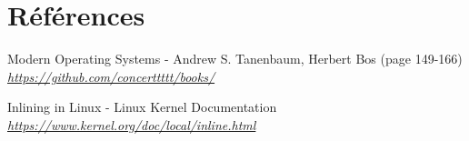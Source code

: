 \documentclass[10pt]{article}
\begin{document}
    \section{Références}
    \begin{thebibliography}{}

        \label{modernos}
        Modern Operating Systems - Andrew S. Tanenbaum, Herbert Bos (page 149-166)\newline
        \href{https://github.com/concerttttt/books/blob/master/Modern Operating Systems 4th Edition--Andrew Tanenbaum.pdf}
        {\textit{https://github.com/concerttttt/books/}}\newline
	
        \label{inlinefunc}
        Inlining in Linux - Linux Kernel Documentation\newline
        \href{https://www.kernel.org/doc/local/inline.html}
        {\textit{https://www.kernel.org/doc/local/inline.html}}\newline
        
    \end{thebibliography}
    
\end{document}
